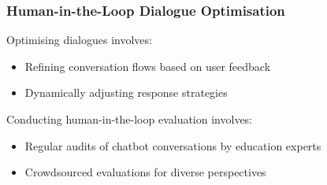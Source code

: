 \documentclass[14pt,a4paper]{article}
\begin{document}
\begin{multicols}{2}
\subsubsection*{Human-in-the-Loop Dialogue Optimisation}
Optimising dialogues \textit{\parencite[pp. 50-100]{Gao2023}} involves:
\begin{itemize}
    \item Refining conversation flows based on user feedback
    \item Dynamically adjusting response strategies
\end{itemize}

Conducting human-in-the-loop evaluation \textit{\parencite[pp. 30-60]{Vaughan2024}} involves:
\begin{itemize}
    \item Regular audits of chatbot conversations by education experts
    \item Crowdsourced evaluations for diverse perspectives
\end{itemize}


%





\end{multicols}
\end{document}
